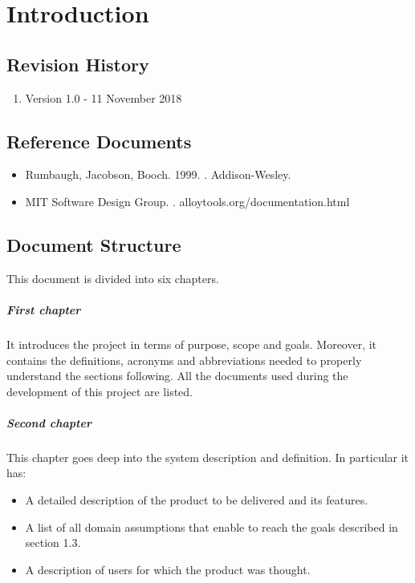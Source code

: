 \documentclass[../rasd.tex]{subfiles}
\begin{document}
\chapter{Introduction}
\thispagestyle{fancy}
		
		
		
		
		
	
		\section{Revision History}
		\begin{enumerate}
			\item Version 1.0 - 11 November 2018
		\end{enumerate}
		\section{Reference Documents}
			\begin{itemize}
				\item Rumbaugh, Jacobson, Booch. 1999. . Addison-Wesley.
				\item MIT Software Design Group. . alloytools.org/documentation.html
			\end{itemize}
		\section{Document Structure}
		This document is divided into six chapters.
		\paragraph{First chapter}
		It introduces the project in terms of purpose, scope and goals. Moreover, it contains the definitions, acronyms and abbreviations needed to properly understand the sections following. All the documents used during the development of this project are listed.
		\paragraph{Second chapter}
		This chapter goes deep into the system description and definition. In particular it has:
		\begin{itemize}
			\item A detailed description of the product to be delivered and its features.
			\item A list of all domain assumptions that enable to reach the goals described in section 1.3.
			\item A description of users for which the product was thought.
		\end{itemize}
\end{document}
